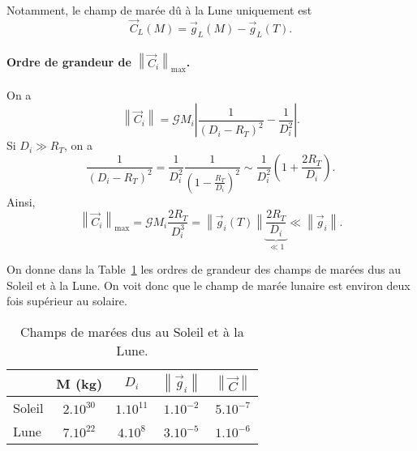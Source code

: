         Notamment, le champ de marée dû à la Lune uniquement est
        \begin{equation*}
            \vec{C}_L(M)=\vec{g}_L(M)-\vec{g}_L(T).
        \end{equation*}

        \paragraph{Ordre de grandeur de $\left\lVert\vec{C}_i\right\rVert_{\text{max}}$.} 
            On a 
            \begin{equation*}
                \left\lVert \vec{C}_i\right\rVert=\mathcal{G}M_i\left\lvert\frac{1}{(D_i-R_T)^{2}}-\frac{1}{D_i^{2}}\right\rvert.
            \end{equation*}
            Si $D_i\gg R_T$, on a 
            \begin{equation*}
                \frac{1}{(D_i-R_T)^{2}}=\frac{1}{D_i^{2}}\frac{1}{\left(1-\frac{R_T}{D_i}\right)^{2}}\sim\frac{1}{D_i^{2}}\left(1+\frac{2R_T}{D_i}\right).
            \end{equation*}
            Ainsi,
            \begin{equation*}
                \left\lVert \vec{C}_i\right\rVert_{\text{max}}=\mathcal{G}M_i\frac{2R_T}{D_i^{3}}=\left\lVert\vec{g}_i(T)\right\rVert\underbrace{\frac{2R_T}{D_i}}_{\ll1}\ll\left\lVert \vec{g}_i\right\rVert.
            \end{equation*}
            
            On donne dans la Table~\ref{tab:champ_maree_soleil_lune} les ordres de grandeur des champs de marées dus au Soleil et à la Lune. On voit donc que le champ de marée lunaire est environ deux fois supérieur au solaire.
            
            \begin{table}
                \centering
                \begin{tabular}{l|c|c|c|c}
                    \toprule
                    & M (kg) & $D_i$ & $\left\lVert \vec{g}_i\right\rVert$ & $\left\lVert\vec{C}\right\rVert$\\ \midrule
                    Soleil & $2.10^{30}$ & $1.10^{11}$ & $1.10^{-2}$ & $5.10^{-7}$\\ \midrule
                    Lune & $7.10^{22}$ & $4.10^{8}$ & $3.10^{-5}$ & $1.10^{-6}$\\ \bottomrule
                \end{tabular}    
                \caption{Champs de marées dus au Soleil et à la Lune.}
                \label{tab:champ_maree_soleil_lune}
            \end{table}
        
